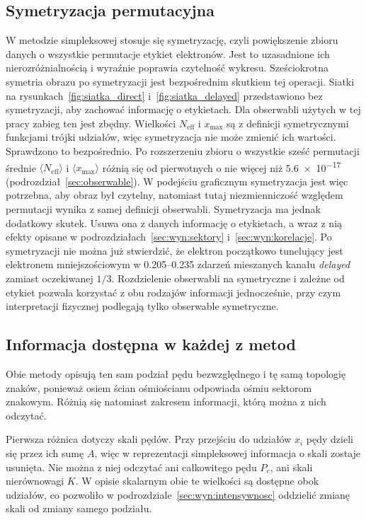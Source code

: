 \documentclass[12pt,a4paper]{article}
\newcommand{\Neff}{N_{\mathrm{eff}}}
\newcommand{\xmax}{x_{\max}}
\begin{document}
\subsection{Symetryzacja permutacyjna}

W metodzie simpleksowej stosuje się symetryzację, czyli powiększenie
zbioru danych o wszystkie permutacje etykiet elektronów. Jest to
uzasadnione ich nierozróżnialnością i wyraźnie poprawia czytelność
wykresu. Sześciokrotna symetria obrazu po symetryzacji jest
bezpośrednim skutkiem tej operacji. Siatki na
rysunkach~\ref{fig:siatka_direct} i~\ref{fig:siatka_delayed}
przedstawiono bez symetryzacji, aby zachować informację o etykietach.
Dla obserwabli użytych w tej pracy zabieg ten jest zbędny. Wielkości
$\Neff$ i $\xmax$ są z definicji symetrycznymi funkcjami trójki
udziałów, więc symetryzacja nie może zmienić ich wartości. Sprawdzono
to bezpośrednio. Po rozszerzeniu zbioru o wszystkie sześć permutacji
średnie $\langle\Neff\rangle$ i $\langle\xmax\rangle$ różnią się od
pierwotnych o nie więcej niż \num{5.6e-17}
(podrozdział~\ref{sec:obserwable}). W podejściu graficznym symetryzacja
jest więc potrzebna, aby obraz był czytelny, natomiast tutaj
niezmienniczość względem permutacji wynika z samej definicji
obserwabli.
Symetryzacja ma jednak dodatkowy skutek. Usuwa ona z danych informację
o etykietach, a wraz z nią efekty opisane w
podrozdziałach~\ref{sec:wyn:sektory} i~\ref{sec:wyn:korelacje}. Po
symetryzacji nie można już stwierdzić, że elektron początkowo
tunelujący jest elektronem mniejszościowym w \num{0.205}--\num{0.235}
zdarzeń mieszanych kanału \emph{delayed} zamiast oczekiwanej $1/3$.
Rozdzielenie obserwabli na symetryczne i zależne od etykiet pozwala
korzystać z obu rodzajów informacji jednocześnie, przy czym
interpretacji fizycznej podlegają tylko obserwable symetryczne.

\subsection{Informacja dostępna w każdej z metod}
Obie metody opisują ten sam podział pędu bezwzględnego i tę samą
topologię znaków, ponieważ osiem ścian ośmiościanu odpowiada ośmiu
sektorom znakowym. Różnią się natomiast zakresem informacji, którą
można z nich odczytać.

Pierwsza różnica dotyczy skali pędów. Przy przejściu do udziałów $x_i$
pędy dzieli się przez ich sumę $A$, więc w reprezentacji simpleksowej
informacja o skali zostaje usunięta. Nie można z niej odczytać ani
całkowitego pędu $P_e$, ani skali nierównowagi $K$. W opisie skalarnym
obie te wielkości są dostępne obok udziałów, co pozwoliło
w podrozdziale~\ref{sec:wyn:intensywnosc} oddzielić zmianę skali od
zmiany samego podziału.
\end{document}
